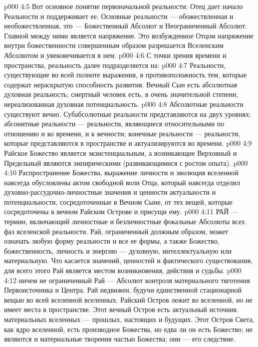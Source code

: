\vs p000 4:5 Вот основное понятие первоначальной реальности: Отец дает начало Реальности и поддерживает ее. Основные  реальности --- обожествленная и необожествленная, это --- Божественный Абсолют и Неограниченный Абсолют. Главной  между ними является напряжение. Это возбужденное Отцом напряжение внутри божественности совершенным образом разрешается Вселенским Абсолютом и увековечивается в нем.
\vs p000 4:6 \pc С точки зрения времени и пространства, реальность далее подразделяется на:
\vs p000 4:7 \bibnobreakspace {} Реальности, существующие во всей полноте выражения, в противоположность тем, которые содержат нераскрытую способность развития. Вечный Сын есть абсолютная духовная реальность; смертный человек есть, в очень значительной степени, нереализованная духовная потенциальность.
\vs p000 4:8 \bibnobreakspace {} Абсолютные реальности существуют вечно. Субабсолютные реальности представляются на двух уровнях: абсонитные реальности --- реальности, являющиеся относительными по отношению и ко времени, и к вечности; конечные реальности --- реальности, которые представляются в пространстве и актуализируются во времени.
\vs p000 4:9 \bibnobreakspace {} Райское Божество является экзистенциальным, а возникающие Верховный и Предельный являются эмпирическими (развивающимися с ростом опыта).
\vs p000 4:10 \bibnobreakspace {} Распространение Божества, выражение личности и эволюция вселенной навсегда обусловлены актом свободной воли Отца, который навсегда отделил духовно\hyp{}рассудочно\hyp{}личностные значения и ценности актуальности и потенциальности, сосредоточенные в Вечном Сыне, от тех вещей, которые сосредоточены в вечном Райском Острове и присущи ему.
\vs p000 4:11 \pc РАЙ --- термин, включающий личностные и безличностные фокальные Абсолюты всех фаз вселенской реальности. Рай, ограниченный должным образом, может означать любую форму реальности и все ее формы, а также Божество, божественность, личность и энергию --- духовную, интеллектуальную или материальную. Что касается значений, ценностей и фактического существования, для всего этого Рай является местом возникновения, действия и судьбы.
\vs p000 4:12 \pc {} ничем не ограниченный Рай --- Абсолют контроля материального тяготения Первоисточника и Центра. Рай недвижен, будучи единственной стационарной вещью во всей вселенной вселенных. Райский Остров лежит во вселенной, но не имеет места в пространстве. Этот вечный Остров есть актуальный источник материальных вселенных --- прошлых, настоящих и будущих. Этот Остров Света, как ядро вселенной, есть производное Божества, но едва ли он есть Божество; не являются и материальные творения частью Божества; они --- его следствие.
